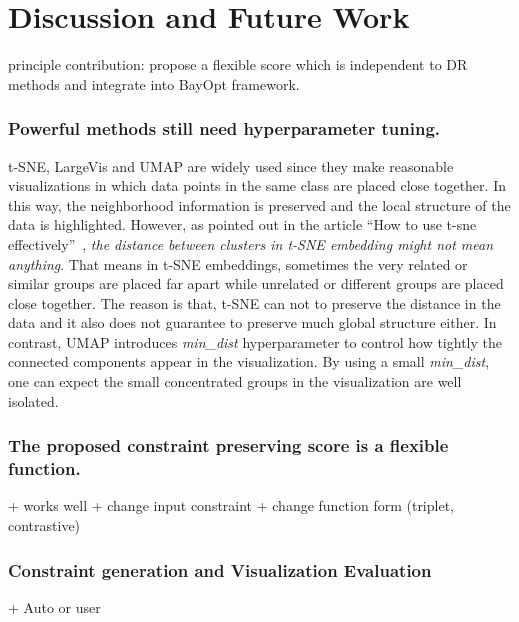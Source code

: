 \begin{figure*}%
    \centering
    \texttt{[image: \{NEURON\_1K\_score\_flexibility]}.png}
    \caption{Flexibility of $f_{score}$ for \emph{NEURON\_1K} dataset}
    \label{fig:flex:neuron}
\end{figure*}


\section{Discussion and Future Work}

principle contribution: propose a flexible score which is independent to DR methods and integrate into BayOpt framework.

\subsubsection*{Powerful methods still need hyperparameter tuning.}
t-SNE, LargeVis and UMAP are widely used since they make reasonable visualizations in which data points in the same class are placed close together.
In this way, the neighborhood information is preserved and the local structure of the data is highlighted.
However, as pointed out in the article ``How to use t-sne effectively''~\cite{wattenberg2016use}, \emph{the distance between clusters in t-SNE embedding might not mean anything}.
That means in t-SNE embeddings, sometimes the very related or similar groups are placed far apart while unrelated or different groups are placed close together.
The reason is that, t-SNE can not to preserve the distance in the data and it also does not guarantee to preserve much global structure either.
In contrast, UMAP introduces \emph{min\_dist} hyperparameter to control how tightly the connected components appear in the visualization.
By using a small \emph{min\_dist}, one can expect the small concentrated groups in the visualization are well isolated.


\subsubsection*{The proposed constraint preserving score is a flexible function.}
+ works well
+ change input constraint
+ change function form (triplet, contrastive)

\subsubsection*{Constraint generation and Visualization Evaluation}
+ Auto or user

